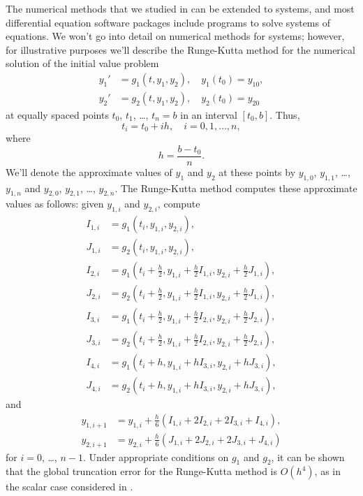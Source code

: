 The  numerical methods that we studied in 
can be extended to systems, and most differential equation software
packages include programs to solve systems of equations. We won't go
into detail on numerical methods for systems;     however, for
illustrative purposes we'll describe  the Runge-Kutta method for
the numerical solution of  the initial value problem
\begin{align*}
y_1'&=g_1(t,y_1,y_2),\quad y_1(t_0)=y_{10},\\
y_2'&=g_2(t,y_1,y_2),\quad y_2(t_0)=y_{20}
\end{align*}
at equally spaced points $t_0$, $t_1$, \dots, $t_n=b$ in an interval
$[t_0,b]$. Thus,
\[
t_i=t_0+ih,\quad i=0,1,\dots,n,
\]
where
\[
h=\frac{b-t_0}{n}.
\]
We'll denote the approximate values of $y_1$ and $y_2$ at these
points by $y_{1,0}$, $y_{1,1}$, \dots, $y_{1,n}$ and
$y_{2,0}$, $y_{2,1}$, \dots, $y_{2,n}$.
The Runge-Kutta method computes these approximate values as follows:
given $y_{1,i}$ and $y_{2,i}$, compute
\begin{align*}
I_{1,i}&=g_1(t_i,y_{1,i},y_{2,i}),\\
J_{1,i}&=g_2(t_i,y_{1,i},y_{2,i}),\\
I_{2,i}&=g_1\left(t_i+\frac{h}{2},y_{1,i}+\frac{h}{2}I_{1,i},y_{2,i}+\frac{h}{2}J_{1,i}\right),\\
J_{2,i}&=g_2\left(t_i+\frac{h}{2},y_{1,i}+\frac{h}{2}I_{1,i},y_{2,i}+\frac{h}{2}J_{1,i}\right),\\
I_{3,i}&=g_1\left(t_i+\frac{h}{2},y_{1,i}+\frac{h}{2}I_{2,i},y_{2,i}+\frac{h}{2}J_{2,i}\right),\\
J_{3,i}&=g_2\left(t_i+\frac{h}{2},y_{1,i}+\frac{h}{2}I_{2,i},y_{2,i}+\frac{h}{2}J_{2,i}\right),\\
I_{4,i}&=g_1(t_i+h,y_{1,i}+hI_{3,i},y_{2,i}+hJ_{3,i}),\\
J_{4,i}&=g_2(t_i+h,y_{1,i}+hI_{3,i},y_{2,i}+hJ_{3,i}),
\end{align*}
and
\begin{align*}
y_{1,i+1}&=y_{1,i}+\frac{h}{6}(I_{1,i}+2I_{2,i}+2I_{3,i}+I_{4,i}),\\
y_{2,i+1}&=y_{2,i}+\frac{h}{6}(J_{1,i}+2J_{2,i}+2J_{3,i}+J_{4,i})
\end{align*}
for $i=0$, \dots, $n-1$. Under appropriate conditions on $g_1$ and $g_2$,
it can be shown that the global truncation error for the Runge-Kutta
method is $O(h^4)$, as in the scalar case considered in
.

